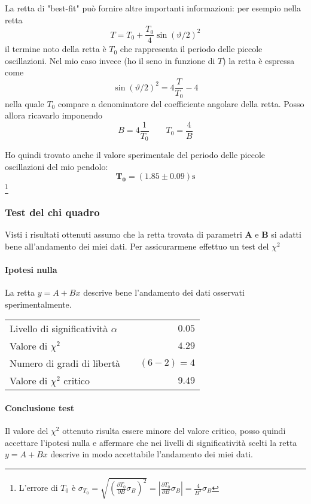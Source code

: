 \documentclass{article}
\begin{document}
	
	\vspace{1.5cm}
	\noindent
	La retta di "best-fit" può fornire altre importanti informazioni: per esempio nella retta 
	\[
	T = T_0 + \frac{T_0}{4}\sin{\left(\vartheta/2\right)}^2
	\]
	il termine noto della retta è $T_0$ che rappresenta il periodo delle piccole oscillazioni. Nel mio caso invece (ho il seno in funzione di $T$) la retta è espressa come
	\[
	\sin{\left(\vartheta/2\right)}^2 = 4\frac{T}{T_0} - 4
	\]
	nella quale $T_0$ compare a denominatore del coefficiente angolare della retta. Posso allora ricavarlo imponendo
	\[
	B =  4\frac{1}{T_0} \qquad T_0 = \frac{4}{B} 
	\]
	
	\noindent
	Ho quindi trovato anche il valore sperimentale del periodo delle piccole oscillazioni del mio pendolo:
	\[
	\mathbf{T_0} = (1.85 \pm 0.09)\text{s}
	\]
	\footnote{L'errore di $T_0$ è $\sigma_{T_0} = \sqrt{\left(\frac{\partial T_0}{\partial B}\sigma_{B}\right)^2} = \left|\frac{\partial T_0}{\partial B}\sigma_{B}\right| = \frac{4}{B^2}\sigma_B$}
	
	\subsubsection{Test del chi quadro}
	Visti i risultati ottenuti assumo che la retta trovata di parametri $\mathbf{A}$ e $\mathbf{B}$ si adatti bene all'andamento dei miei dati. Per assicurarmene effettuo un test del $\chi^2$
	
	\paragraph{Ipotesi nulla} La retta $y = A + Bx$ descrive bene l'andamento dei dati osservati sperimentalmente.
	
	\vspace{0.7cm}
	\begin{table}[H]
		\centering
		\begin{tabular}{lr} 
			Livello di significatività $\alpha$		&$\quad 0.05$  \\
			Valore di $\chi ^2$             	& $\quad 4.29$       \\
			Numero di gradi di libertà      	& $\quad (6-2) = 4$         \\   
			Valore di $\chi ^2$ critico     	& $\quad 9.49$
		\end{tabular}
	\end{table}
	\vspace{0.7cm}
	
	\paragraph{Conclusione test} Il valore del $\chi^2$ ottenuto risulta essere minore del valore critico, posso quindi accettare l'ipotesi nulla e affermare che nei livelli di significatività scelti la retta $y = A + Bx$ descrive in modo accettabile l'andamento dei miei dati.
	
\end{document}
